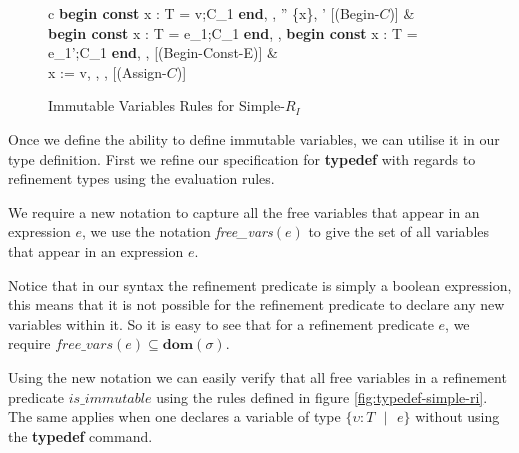 \documentclass[a4paper,12pt]{report}
\begin{document}
\begin{figure}[h]
  \begin{center}
    \begin{tabular}{c}
      {\langle \textbf{begin const }x : T = v;C_1\textbf{ end}, \sigma, \tau \rangle 
      \longrightarrow \langle \sigma'' \setminus \{x\}, \tau' \rangle} [(Begin-$C$)] 
      & \\
      \footnotesize
      {\langle \textbf{begin const }x : T = e_1;C_1\textbf{ end}, \sigma,\tau \rangle 
      \longrightarrow \langle \textbf{begin const }x : T = e_1';C_1\textbf{ end}, \sigma, \tau \rangle}
      [(Begin-Const-E)]
      \normalsize
      & \\
      {\langle x := v, \sigma, \tau \rangle \longrightarrow \langle \sigma[x \mapsto v], 
      \tau \rangle} [(Assign-$C$)]
    \end{tabular}
  \end{center}
  \caption{Immutable Variables Rules for Simple-$R_{I}$}
  \label{fig:immu_rules}
\end{figure}

\par
Once we define the ability to define immutable variables, we can utilise it in 
our type definition. First we refine our specification for \textbf{typedef} 
with regards to refinement types using the evaluation rules.

\par
We require a new notation to capture all the free variables that appear in an 
expression $e$, we use the notation \textit{free\_vars}$(e)$ to give the set of all 
variables that appear in an expression $e$.

\par
Notice that in our syntax the refinement predicate is simply a boolean 
expression, this means that it is not possible for the refinement predicate to 
declare any new variables within it. So it is easy to see that for a refinement 
predicate $e$, we require $\textit{free\_vars}(e) \subseteq \textbf{dom}(\sigma)$.

\par
Using the new notation we can easily verify that all free variables in a 
refinement predicate $is\_immutable$ using the rules defined in figure 
\ref{fig:typedef-simple-ri}. The same 
applies when one declares a variable of type $\{\upsilon : T\text{ }|\text{ }e\}$ 
without using the \textbf{typedef} command.
\end{document}

